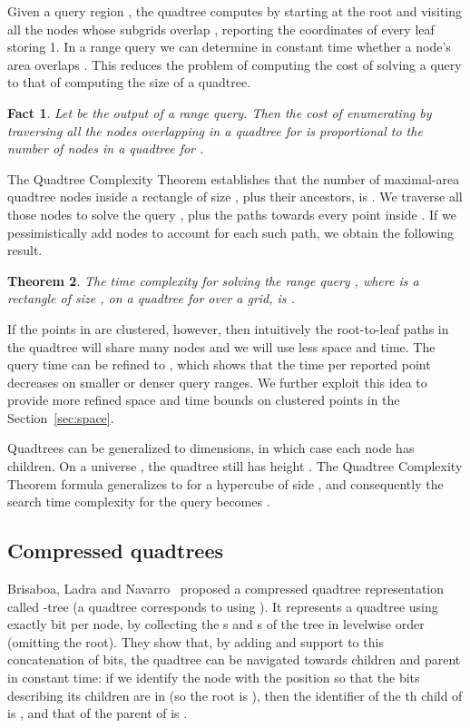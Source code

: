 \documentclass{elsarticle}
\newtheorem{theorem}{Theorem}
\newtheorem{fact}[theorem]{Fact}
\begin{document}
Given a query region , the quadtree computes  by starting at the root and visiting all the nodes whose subgrids overlap , reporting the coordinates of every leaf storing 1. In a range query we can determine in constant time whether a node's area overlaps . This reduces the problem of computing the cost of solving a query to that of computing the size of a quadtree.

\begin{fact}
\label{fact:size}
Let  be the output of a range query. Then the cost of enumerating  by traversing all the nodes overlapping  in a quadtree for  is proportional to the number of nodes in a quadtree for .
\end{fact}

The Quadtree Complexity Theorem \cite{Kli71,HS79,Sam06} establishes that the number of maximal-area quadtree nodes inside a rectangle  of size , plus their ancestors, is . We traverse all those nodes to 
solve the query , plus the paths towards every point inside
. If we pessimistically add  nodes to account for each such path, 
we obtain the following result.

\begin{theorem}
The time complexity for solving the range query , 
where  is a rectangle of size , on a quadtree for  over 
a  grid, is .
\end{theorem}

If the points in  are clustered, however, then intuitively the root-to-leaf paths in the quadtree will share many nodes and we will use less space and time. The query time can be refined to  \cite[p.~361]{Nav16}, which shows that the time per reported point decreases on smaller or denser query ranges.
We further exploit this idea to provide more refined space and time bounds on clustered points in the Section~\ref{sec:space}.

\medskip

Quadtrees can be generalized to  dimensions, in which case each node 
has  children. On a universe , the quadtree still has height 
. The Quadtree Complexity Theorem formula generalizes
to  for a hypercube  of side , and consequently
the search time complexity for the query  becomes
.

\subsection{Compressed quadtrees}
\label{sec:comprquad}

Brisaboa, Ladra and Navarro~\cite{BLN14} proposed a compressed quadtree representation called -tree (a quadtree corresponds to using ). It represents a quadtree using exactly  bit per node, by collecting the s and s of the tree in levelwise order (omitting the root). 
They show that, by adding  and  support to this concatenation of bits, the quadtree can be navigated towards children and parent in constant time: if we identify the node  with the position  so that the  bits describing its children are in  (so the root is ), then the identifier of the th child of  is , and that of the parent of  is .
\end{document}

